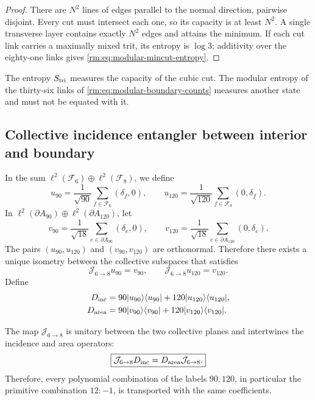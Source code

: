 \begin{proof}
There are \(N^2\) lines of edges parallel to the normal direction, pairwise
disjoint. Every cut must intersect each one, so its capacity
is at least \(N^2\). A single transverse layer contains exactly
\(N^2\) edges and attains the minimum. If each cut link carries a
maximally mixed trit, its entropy is \(\log3\); additivity over the
eighty-one links gives \cref{rm:eq:modular-mincut-entropy}.
\end{proof}

The entropy \(S_{\rm tri}\) measures the capacity of the cubic cut. The
modular entropy of the thirty-six links of
\cref{rm:eq:modular-boundary-counts} measures another state and must not be equated with
it.

\subsection{Collective incidence entangler between interior and boundary}

In the sum
\(\ell^2(\mathcal F_6)\oplus\ell^2(\mathcal F_8)\), we define
\begin{equation}
\label{rm:eq:modular-u90-u120}
u_{90}=\frac1{\sqrt{90}}\sum_{f\in\mathcal F_6}(\delta_f,0),
\qquad
u_{120}=\frac1{\sqrt{120}}\sum_{f\in\mathcal F_8}(0,\delta_f).
\end{equation}
In
\(\ell^2(\partial A_{90})\oplus\ell^2(\partial A_{120})\), let
\begin{equation}
\label{rm:eq:modular-v90-v120}
v_{90}=\frac1{\sqrt{18}}\sum_{e\in\partial A_{90}}(\delta_e,0),
\qquad
v_{120}=\frac1{\sqrt{18}}\sum_{e\in\partial A_{120}}(0,\delta_e).
\end{equation}
The pairs \((u_{90},u_{120})\) and \((v_{90},v_{120})\) are orthonormal.
Therefore there exists a unique isometry between the collective subspaces
that satisfies
\begin{equation}
\label{rm:eq:modular-J68}
\mathcal J_{6\to8}u_{90}=v_{90},
\qquad
\mathcal J_{6\to8}u_{120}=v_{120}.
\end{equation}
Define
\begin{align}
D_{\rm inc}
&=90|u_{90}\rangle\langle u_{90}|
+120|u_{120}\rangle\langle u_{120}|,
\label{rm:eq:modular-Dinc}\\
D_{\rm area}
&=90|v_{90}\rangle\langle v_{90}|
+120|v_{120}\rangle\langle v_{120}|.
\label{rm:eq:modular-Darea}
\end{align}

\begin{theorem}
\label{rm:thm:modular-J68}
The map \(\mathcal J_{6\to8}\) is unitary between the two collective
planes and intertwines the incidence and area operators:
\begin{equation}
\label{rm:eq:modular-J-intertwining}
\boxed{
\mathcal J_{6\to8}D_{\rm inc}
=D_{\rm area}\mathcal J_{6\to8}.}
\end{equation}
Therefore, every polynomial combination of the labels \(90,120\), in
particular the primitive combination \(12:-1\), is transported with the
same coefficients.
\end{theorem}

